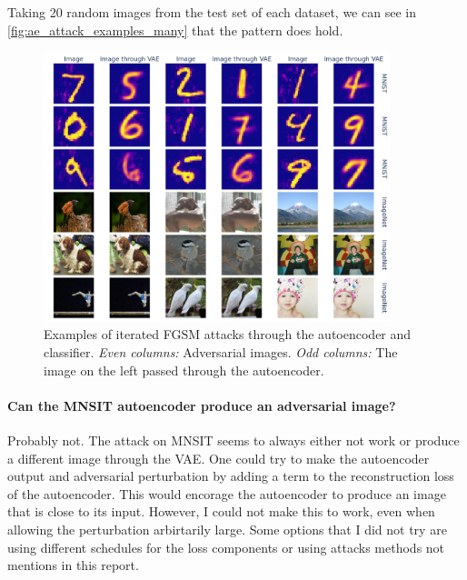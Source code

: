 \documentclass[]{scrarticle}
\renewcommand{\todo}[1]{}
\begin{document}
Taking 20 random images from the test set of each dataset,
we can see in \autoref{fig:ae_attack_examples_many} that the pattern
does hold.

\begin{figure}[h]
  \centering
  \includegraphics[width=0.9\textwidth]{../images/ae_many_attack_examples.png}
  \caption{
    Examples of iterated FGSM attacks through the autoencoder and classifier.
    \emph{Even columns:} Adversarial images.
    \emph{Odd columns:} The image on the left passed through the autoencoder.
  }
  \label{fig:ae_attack_examples_many}
\end{figure}

\paragraph{Can the MNSIT autoencoder produce an adversarial image?}
Probably not.
The attack on MNSIT seems to always either not work or produce
a different image through the VAE. One could try to make the autoencoder
output and adversarial perturbation by adding a term to the reconstruction
loss of the autoencoder. This would encorage the autoencoder to produce
an image that is close to its input.
However, I could not make this to work, even when allowing the perturbation
arbirtarily large. Some options that I did not try are using different schedules for
the loss components or using attacks methods not mentions in this report.
\end{document}
